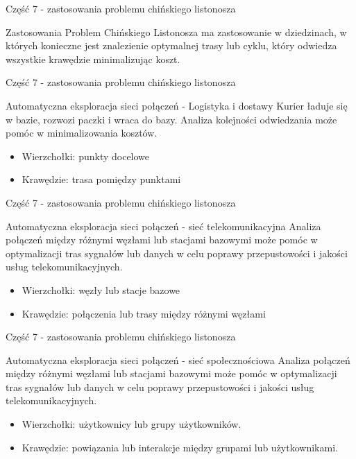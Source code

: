 \documentclass[polish,envcountsect,10pt]{beamer}
\begin{document}
\begin{frame}{Część 7 - zastosowania problemu chińskiego listonosza}
    \begin{block}{Zastosowania}
        Problem Chińskiego Listonosza ma zastosowanie w dziedzinach, w których konieczne jest znalezienie
        optymalnej trasy lub cyklu, który odwiedza wszystkie krawędzie minimalizując koszt.
    \end{block}
\end{frame}

\begin{frame}{Część 7 - zastosowania problemu chińskiego listonosza}
    \begin{block}{Automatyczna eksploracja sieci połączeń - Logistyka i dostawy}
        Kurier ładuje się w bazie, rozwozi paczki i wraca do bazy.
        Analiza kolejności odwiedzania może pomóc w minimalizowania kosztów.
        \begin{itemize}
            \item Wierzchołki: punkty docelowe
            \item Krawędzie: trasa pomiędzy punktami
        \end{itemize}
    \end{block}
\end{frame}

\begin{frame}{Część 7 - zastosowania problemu chińskiego listonosza}
    \begin{block}{Automatyczna eksploracja sieci połączeń - sieć telekomunikacyjna}
        Analiza połączeń między różnymi węzłami lub stacjami bazowymi może pomóc w optymalizacji tras sygnałów lub danych w celu poprawy przepustowości i jakości usług telekomunikacyjnych.
        \begin{itemize}
            \item Wierzchołki: węzły lub stacje bazowe
            \item Krawędzie: połączenia lub trasy między różnymi węzłami
        \end{itemize}
    \end{block}
\end{frame}

\begin{frame}{Część 7 - zastosowania problemu chińskiego listonosza}
    \begin{block}{Automatyczna eksploracja sieci połączeń - sieć społecznościowa}
        Analiza połączeń między różnymi węzłami lub stacjami bazowymi może pomóc w optymalizacji tras sygnałów lub danych w celu poprawy przepustowości i jakości usług telekomunikacyjnych.
        \begin{itemize}
            \item Wierzchołki: użytkownicy lub grupy użytkowników.
            \item Krawędzie: powiązania lub interakcje między grupami lub użytkownikami.
        \end{itemize}
    \end{block}
\end{frame}
\end{document}
